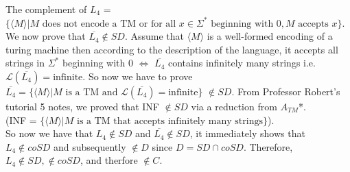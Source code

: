 \documentclass{csc_assignment}
\begin{document}
\begin{description}
\begin{enumerate}
The complement of $L_{4}$ = $\{\langle{M}\rangle | M \text{ does not encode a TM or for all } x \in \Sigma^* \text{ beginning with } 0, M \text{ accepts }x\}$. \\ We now prove that $\overline{L_{4}} \notin SD$. Assume that $\langle M \rangle$ is a well-formed encoding of a turing machine then according to the description of the language, it accepts all strings in $\Sigma^{*}$ beginning with $0$ $\Leftrightarrow$ $\overline{L_{4}}$ contains infinitely many strings i.e. $\mathcal{L}(\overline{L_4}) = \text{infinite}$. So now we have to prove $\overline{L_4} = \{\langle{M}\rangle | M \text{ is a TM and } \mathcal{L}(\overline{L_4}) = \text{infinite}\}$ $\notin SD$. From Professor Robert's tutorial 5 notes, we proved that INF $\notin SD$ via a reduction from $A_{TM}$*.\\ (INF = $\{\langle M \rangle | M \text{ is a TM that accepts infinitely many strings} \}$). \\ So now we have that $L_{4} \notin SD$ and $\overline{L_4} \notin SD$, it immediately shows that $L_{4} \notin coSD$ and subsequently $\notin D$ since $D = SD \cap coSD$. Therefore, $L_{4} \notin SD, \notin coSD$, and therfore $\notin C$.
  \end{enumerate}
  


\end{description}
\end{document}
